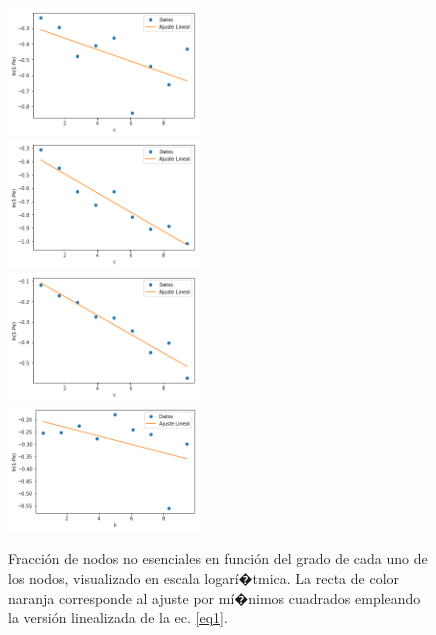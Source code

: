 \documentclass[%
 reprint,
 amsmath,amssymb,
 aps,
]{revtex4-1}
\begin{document}
\begin{figure}
\includegraphics[width=0.45\textwidth]{figura4a.png}\\
\includegraphics[width=0.45\textwidth]{figura4b.png}\\
\includegraphics[width=0.45\textwidth]{figura4c.png}\\
\includegraphics[width=0.45\textwidth]{figura4d.png}\\
\caption{Fracci\'on de nodos no esenciales en funci\'on del grado de cada uno de los nodos, visualizado en escala logar\'i�tmica. La recta de color naranja corresponde al ajuste por m\'i�nimos cuadrados empleando la versi\'on linealizada de la ec. \ref{eq1}.}
\label{figura4}
\end{figure}
\end{document}
